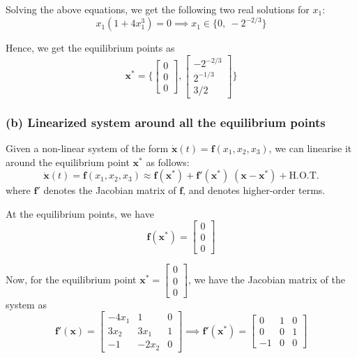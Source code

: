 Solving the above equations, we get the following two real solutions for \( x_1 \):
\[
    x_1(1 + 4x_1^3) = 0
    \implies
    x_1 \in \{ 0, \ -2^{-2/3} \}
\]

Hence, we get the equilibrium points as
\[
    \boxed{
        \mathbf{x^*} =
        \Bigg \{
        \begin{bmatrix}
            0 \\
            0 \\
            0
        \end{bmatrix},
        \begin{bmatrix}
            -2^{-2/3} \\
            2^{-1/3}  \\
            3/2
        \end{bmatrix}
        \Bigg \}
    }
\]

\subsubsection*{(b) Linearized system around all the equilibrium points}

Given a non-linear system of the form \( \mathbf{\dot x}(t) = \mathbf{f}(x_1, x_2, x_3) \), we can linearise it around the equilibrium point \( \mathbf{x^*} \) as follows:
\[
    \mathbf{\dot x}(t) = \mathbf{f}(x_1, x_2, x_3) \approx \mathbf{f}(\mathbf{x^*}) + \mathbf{f'}(\mathbf{x^*})\; (\mathbf{x} - \mathbf{x^*}) + \text{H.O.T.}
\]
where \(\mathbf{f'}\) denotes the Jacobian matrix of \(\mathbf{f}\), and  denotes higher-order terms.

At the equilibrium points, we have
\[
    \mathbf{f}(\mathbf{x^*}) =
    \begin{bmatrix}
        0 \\
        0 \\
        0
    \end{bmatrix}
\]

Now, for the equilibrium point \( \mathbf{x^*} = \begin{bmatrix} 0 \\ 0 \\ 0 \end{bmatrix} \), we have the Jacobian matrix of the system as
\[
    \mathbf{f'}(\mathbf{x}) =
    \begin{bmatrix}
        -4x_1 & 1     & 0 \\
        3x_2  & 3x_1  & 1 \\
        -1    & -2x_2 & 0
    \end{bmatrix}
    \implies
    \mathbf{f'}(\mathbf{x^*}) =
    \begin{bmatrix}
        0  & 1 & 0 \\
        0  & 0 & 1 \\
        -1 & 0 & 0
    \end{bmatrix}
\]

